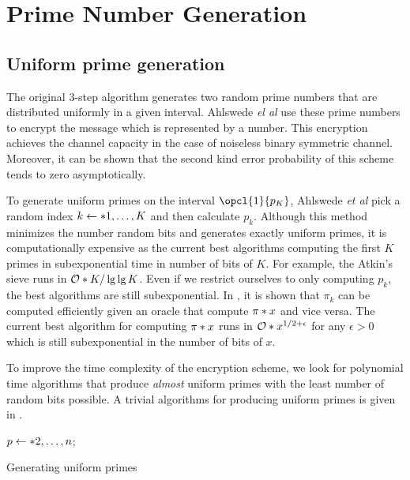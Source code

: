 \section{Prime Number Generation}
\subsection{Uniform prime generation}\label{subsec:unifprime}
The original 3-step algorithm \cite{multiway} generates two random prime numbers that are distributed uniformly in a given interval. Ahlswede \textit{el al} use these prime numbers to encrypt the message which is represented by a number. This encryption achieves the channel capacity in the case of noiseless binary symmetric channel. Moreover, it can be shown that the second kind error probability of this scheme tends to zero asymptotically. 

To generate uniform primes on the interval \(\opcl{1}{p_K}\), Ahlswede \textit{et al} pick a random index \(k \gets \set{1, \dots, K}\) and then calculate \(p_k\). Although this method minimizes the number random bits and generates exactly uniform primes, it is computationally expensive as the current best algorithms computing the first \(K\) primes in subexponential time in number of bits of \(K\). For example, the Atkin's sieve \cite{atkin} runs in \(\bigO{K / \lg \lg K}\). Even if we restrict ourselves to only computing \(p_k\), the best algorithms are still subexponential. In \cite[Chapter 9.9]{bach}, it is shown that \(\pi_k\) can be computed efficiently given an oracle that compute \(\func{\pi}{x}\) and vice versa. The current best algorithm for computing \(\func{\pi}{x}\) runs in \(\bigO{x^{1/2 + \epsilon}}\)\cite{lagarias} for any \(\epsilon > 0\) which is still subexponential in the number of bits of \(x\).  

To improve the time complexity of the encryption scheme, we look for polynomial time algorithms that produce \textit{almost} uniform primes with the least number of random bits possible. A trivial algorithms for producing uniform primes is given in .
\begin{algorithm}
	\DontPrintSemicolon
    {
        \(p \gets \set{2,\dots, n}\);
    }
	\caption{Generating uniform primes}
    \label{alg:trivialPNG}
\end{algorithm}

